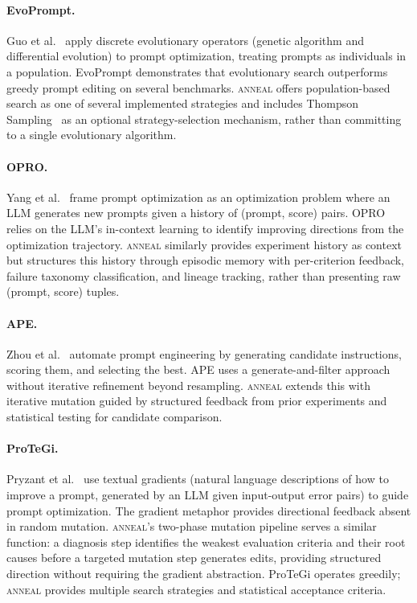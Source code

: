 \paragraph{EvoPrompt.}
Guo et al.~\cite{guo2023evoprompt} apply discrete evolutionary operators (genetic algorithm and differential evolution) to prompt optimization, treating prompts as individuals in a population.
EvoPrompt demonstrates that evolutionary search outperforms greedy prompt editing on several benchmarks.
\textsc{anneal} offers population-based search as one of several implemented strategies and includes Thompson Sampling~\cite{thompson1933likelihood} as an optional strategy-selection mechanism, rather than committing to a single evolutionary algorithm.

\paragraph{OPRO.}
Yang et al.~\cite{yang2024opro} frame prompt optimization as an optimization problem where an LLM generates new prompts given a history of (prompt, score) pairs.
OPRO relies on the LLM's in-context learning to identify improving directions from the optimization trajectory.
\textsc{anneal} similarly provides experiment history as context but structures this history through episodic memory with per-criterion feedback, failure taxonomy classification, and lineage tracking, rather than presenting raw (prompt, score) tuples.

\paragraph{APE.}
Zhou et al.~\cite{zhou2023ape} automate prompt engineering by generating candidate instructions, scoring them, and selecting the best.
APE uses a generate-and-filter approach without iterative refinement beyond resampling.
\textsc{anneal} extends this with iterative mutation guided by structured feedback from prior experiments and statistical testing for candidate comparison.

\paragraph{ProTeGi.}
Pryzant et al.~\cite{pryzant2023protegi} use textual gradients (natural language descriptions of how to improve a prompt, generated by an LLM given input-output error pairs) to guide prompt optimization.
The gradient metaphor provides directional feedback absent in random mutation.
\textsc{anneal}'s two-phase mutation pipeline serves a similar function: a diagnosis step identifies the weakest evaluation criteria and their root causes before a targeted mutation step generates edits, providing structured direction without requiring the gradient abstraction.
ProTeGi operates greedily; \textsc{anneal} provides multiple search strategies and statistical acceptance criteria.


